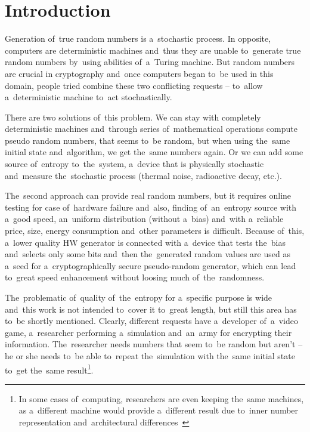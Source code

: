 \chapter{Introduction}
\par{
Generation of~true random numbers is a~stochastic process.
In opposite, computers are deterministic machines 
and~thus they are unable to~generate true random numbers by~using abilities 
of~a~Turing machine. 
But random numbers are crucial in cryptography and~once computers began 
to~be used in this domain, people tried combine these two conflicting requests 
-- to~allow a~deterministic machine to~act stochastically. 
}

\par{
There are two solutions of~this problem. We can stay with completely 
deterministic machines and~through series of~mathematical operations 
compute pseudo random numbers, that seems to~be random, 
but when using the~same initial state and~algorithm, we get the~same 
numbers again. Or we can add some source of~entropy to~the~system, 
a~device that is physically stochastic and~measure the~stochastic process 
(thermal noise, radioactive decay, etc.).
}

\par{
The~second approach can provide real random numbers, but it requires online 
testing for case of~hardware failure and~also, finding of~an~entropy source with
a~good speed, an~uniform distribution (without a~bias) and~with a~reliable price,
size, energy consumption and~other parameters is difficult. Because of~this, 
a~lower quality HW generator is connected with a~device that tests the~bias 
and~selects only some bits and~then the~generated random values are used 
as a~seed for a~cryptographically secure pseudo-random generator, 
which can lead to~great speed enhancement without loosing much 
of~the~randomness.
}

\par{
The~problematic of~quality of~the~entropy for a~specific purpose is wide 
and~this work is not intended to~cover it to~great length, but still this area 
has to~be shortly mentioned. Clearly, different requests have a~developer 
of~a~video game, a~researcher performing a~simulation and~an~army 
for encrypting their information. 
The~researcher needs numbers that seem to~be random but aren't 
-- he or she needs to~be able to~repeat the~simulation with the~same initial state 
to~get the~same result\footnote{In some cases of~computing, 
researchers are even keeping the~same machines, as a~different machine 
would provide a~different result due to~inner number representation and~architectural differences~\cite{ArithmeticInCloud}}.
}

